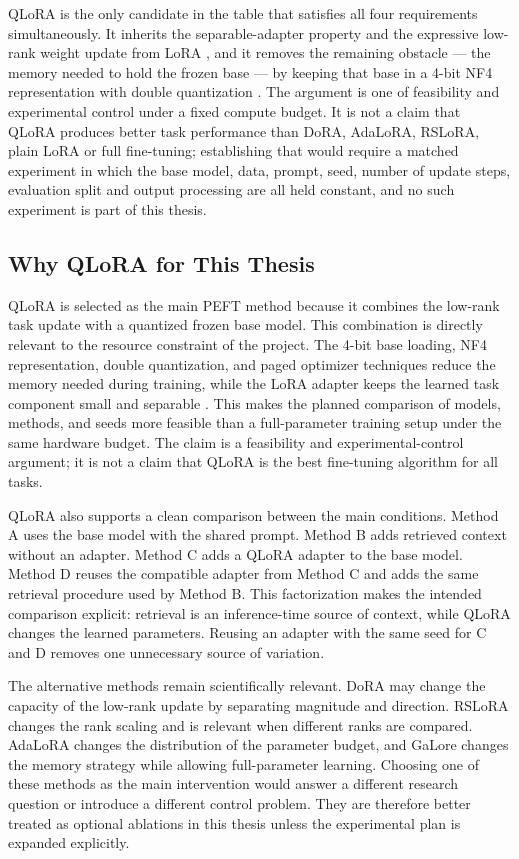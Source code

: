 QLoRA is the only candidate in the table that satisfies all four requirements simultaneously. It inherits the separable-adapter property and the expressive low-rank weight update from LoRA \cite{hu2022lora}, and it removes the remaining obstacle --- the memory needed to hold the frozen base --- by keeping that base in a 4-bit NF4 representation with double quantization \cite{dettmers2023qlora}. The argument is one of feasibility and experimental control under a fixed compute budget. It is not a claim that QLoRA produces better task performance than DoRA, AdaLoRA, RSLoRA, plain LoRA or full fine-tuning; establishing that would require a matched experiment in which the base model, data, prompt, seed, number of update steps, evaluation split and output processing are all held constant, and no such experiment is part of this thesis.

\fi
\subsection{Why QLoRA for This Thesis}

QLoRA is selected as the main PEFT method because it combines the low-rank task update with a quantized frozen base model. This combination is directly relevant to the resource constraint of the project. The 4-bit base loading, NF4 representation, double quantization, and paged optimizer techniques reduce the memory needed during training, while the LoRA adapter keeps the learned task component small and separable \cite{dettmers2023qlora}. This makes the planned comparison of models, methods, and seeds more feasible than a full-parameter training setup under the same hardware budget. The claim is a feasibility and experimental-control argument; it is not a claim that QLoRA is the best fine-tuning algorithm for all tasks.

QLoRA also supports a clean comparison between the main conditions. Method A uses the base model with the shared prompt. Method B adds retrieved context without an adapter. Method C adds a QLoRA adapter to the base model. Method D reuses the compatible adapter from Method C and adds the same retrieval procedure used by Method B. This factorization makes the intended comparison explicit: retrieval is an inference-time source of context, while QLoRA changes the learned parameters. Reusing an adapter with the same seed for C and D removes one unnecessary source of variation.

The alternative methods remain scientifically relevant. DoRA may change the capacity of the low-rank update by separating magnitude and direction. RSLoRA changes the rank scaling and is relevant when different ranks are compared. AdaLoRA changes the distribution of the parameter budget, and GaLore changes the memory strategy while allowing full-parameter learning. Choosing one of these methods as the main intervention would answer a different research question or introduce a different control problem. They are therefore better treated as optional ablations in this thesis unless the experimental plan is expanded explicitly.

